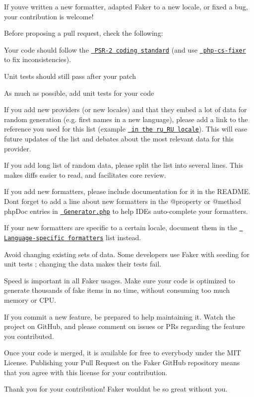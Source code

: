 If you\textquotesingle{}ve written a new formatter, adapted Faker to a new locale, or fixed a bug, your contribution is welcome!

Before proposing a pull request, check the following\+:


\begin{DoxyItemize}
\item Your code should follow the \href{https://github.com/php-fig/fig-standards/blob/master/accepted/PSR-2-coding-style-guide.md}{\texttt{ PSR-\/2 coding standard}} (and use \href{https://github.com/fabpot/PHP-CS-Fixer}{\texttt{ php-\/cs-\/fixer}} to fix inconsistencies).
\item Unit tests should still pass after your patch
\item As much as possible, add unit tests for your code
\item If you add new providers (or new locales) and that they embed a lot of data for random generation (e.\+g. first names in a new language), please add a link to the reference you used for this list (example \href{https://github.com/fzaninotto/Faker/blob/master/src/Faker/Provider/ru_RU/Person.php\#L13}{\texttt{ in the ru\+\_\+\+RU locale}}). This will ease future updates of the list and debates about the most relevant data for this provider.
\item If you add long list of random data, please split the list into several lines. This makes diffs easier to read, and facilitates core review.
\item If you add new formatters, please include documentation for it in the README. Don\textquotesingle{}t forget to add a line about new formatters in the {\ttfamily @property} or {\ttfamily @method} php\+Doc entries in \href{https://github.com/fzaninotto/Faker/blob/master/src/Faker/Generator.php\#L6-L118}{\texttt{ Generator.\+php}} to help IDEs auto-\/complete your formatters.
\item If your new formatters are specific to a certain locale, document them in the \href{https://github.com/fzaninotto/Faker\#language-specific-formatters}{\texttt{ Language-\/specific formatters}} list instead.
\item Avoid changing existing sets of data. Some developers use Faker with seeding for unit tests ; changing the data makes their tests fail.
\item Speed is important in all Faker usages. Make sure your code is optimized to generate thousands of fake items in no time, without consuming too much memory or CPU.
\item If you commit a new feature, be prepared to help maintaining it. Watch the project on Git\+Hub, and please comment on issues or PRs regarding the feature you contributed.
\end{DoxyItemize}

Once your code is merged, it is available for free to everybody under the MIT License. Publishing your Pull Request on the Faker Git\+Hub repository means that you agree with this license for your contribution.

Thank you for your contribution! Faker wouldn\textquotesingle{}t be so great without you. 